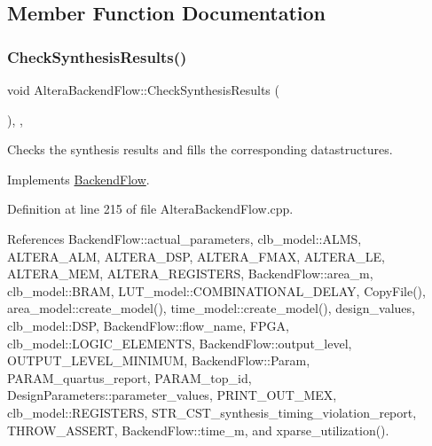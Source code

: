 \subsection{Member Function Documentation}
\mbox{\label{classAlteraBackendFlow_a36da7a0f6807798fbbb334b6cb5d4677}} 
\subsubsection{\texorpdfstring{Check\+Synthesis\+Results()}{CheckSynthesisResults()}}
{\footnotesize\ttfamily void Altera\+Backend\+Flow\+::\+Check\+Synthesis\+Results (\begin{DoxyParamCaption}{ }\end{DoxyParamCaption})\hspace{0.3cm}{\ttfamily [override]}, {\ttfamily [private]}, {\ttfamily [virtual]}}



Checks the synthesis results and fills the corresponding datastructures. 



Implements \hyperlink{classBackendFlow_ad2096d43b7c9c47611d719188215f23f}{Backend\+Flow}.



Definition at line 215 of file Altera\+Backend\+Flow.\+cpp.



References Backend\+Flow\+::actual\+\_\+parameters, clb\+\_\+model\+::\+A\+L\+MS, A\+L\+T\+E\+R\+A\+\_\+\+A\+LM, A\+L\+T\+E\+R\+A\+\_\+\+D\+SP, A\+L\+T\+E\+R\+A\+\_\+\+F\+M\+AX, A\+L\+T\+E\+R\+A\+\_\+\+LE, A\+L\+T\+E\+R\+A\+\_\+\+M\+EM, A\+L\+T\+E\+R\+A\+\_\+\+R\+E\+G\+I\+S\+T\+E\+RS, Backend\+Flow\+::area\+\_\+m, clb\+\_\+model\+::\+B\+R\+AM, L\+U\+T\+\_\+model\+::\+C\+O\+M\+B\+I\+N\+A\+T\+I\+O\+N\+A\+L\+\_\+\+D\+E\+L\+AY, Copy\+File(), area\+\_\+model\+::create\+\_\+model(), time\+\_\+model\+::create\+\_\+model(), design\+\_\+values, clb\+\_\+model\+::\+D\+SP, Backend\+Flow\+::flow\+\_\+name, F\+P\+GA, clb\+\_\+model\+::\+L\+O\+G\+I\+C\+\_\+\+E\+L\+E\+M\+E\+N\+TS, Backend\+Flow\+::output\+\_\+level, O\+U\+T\+P\+U\+T\+\_\+\+L\+E\+V\+E\+L\+\_\+\+M\+I\+N\+I\+M\+UM, Backend\+Flow\+::\+Param, P\+A\+R\+A\+M\+\_\+quartus\+\_\+report, P\+A\+R\+A\+M\+\_\+top\+\_\+id, Design\+Parameters\+::parameter\+\_\+values, P\+R\+I\+N\+T\+\_\+\+O\+U\+T\+\_\+\+M\+EX, clb\+\_\+model\+::\+R\+E\+G\+I\+S\+T\+E\+RS, S\+T\+R\+\_\+\+C\+S\+T\+\_\+synthesis\+\_\+timing\+\_\+violation\+\_\+report, T\+H\+R\+O\+W\+\_\+\+A\+S\+S\+E\+RT, Backend\+Flow\+::time\+\_\+m, and xparse\+\_\+utilization().

